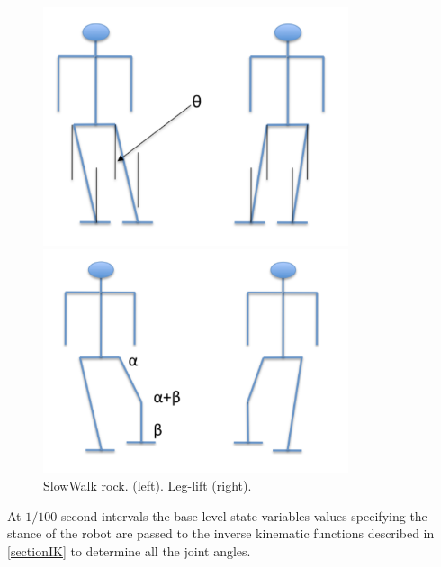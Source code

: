 \documentclass[pdftex,11pt,a4paper]{report}
\begin{document}
\begin{figure}
  \centering
  \begin{minipage}[b]{8 cm}
     \includegraphics[width=0.8\textwidth]{figures/SlowwakRock}  
  \end{minipage}
  \begin{minipage}[b]{8 cm}
    \includegraphics[width=0.8\textwidth]{figures/SlowwalkLeglift}  
  \end{minipage}
  \caption{SlowWalk rock. (left). Leg-lift (right).}
  \label{figSlowwakRock}
\end{figure}

At $1/100$ second intervals the base level state variables values specifying the stance of the robot are passed to the inverse kinematic functions described in \autoref{sectionIK} to determine all the joint angles. 
\end{document}

